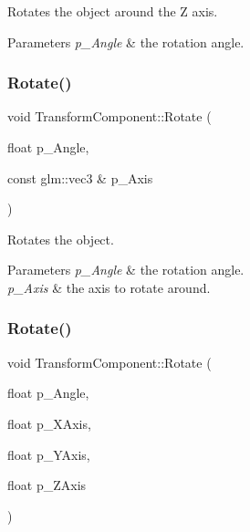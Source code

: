 Rotates the object around the Z axis. 


\begin{DoxyParams}{Parameters}
{\em p\+\_\+\+Angle} & the rotation angle. \\
\hline
\end{DoxyParams}
\mbox{\label{class_transform_component_a2417252e806d5f67a5cdb25bd4e90a42}} 
\subsubsection{\texorpdfstring{Rotate()}{Rotate()}\hspace{0.1cm}{\footnotesize\ttfamily [1/2]}}
{\footnotesize\ttfamily void Transform\+Component\+::\+Rotate (\begin{DoxyParamCaption}\item[{float}]{p\+\_\+\+Angle,  }\item[{const glm\+::vec3 \&}]{p\+\_\+\+Axis }\end{DoxyParamCaption})\hspace{0.3cm}{\ttfamily [inline]}}



Rotates the object. 


\begin{DoxyParams}{Parameters}
{\em p\+\_\+\+Angle} & the rotation angle. \\
\hline
{\em p\+\_\+\+Axis} & the axis to rotate around. \\
\hline
\end{DoxyParams}
\mbox{\label{class_transform_component_aabc8784119f8794363bc1b3cfe12c4a7}} 
\subsubsection{\texorpdfstring{Rotate()}{Rotate()}\hspace{0.1cm}{\footnotesize\ttfamily [2/2]}}
{\footnotesize\ttfamily void Transform\+Component\+::\+Rotate (\begin{DoxyParamCaption}\item[{float}]{p\+\_\+\+Angle,  }\item[{float}]{p\+\_\+\+X\+Axis,  }\item[{float}]{p\+\_\+\+Y\+Axis,  }\item[{float}]{p\+\_\+\+Z\+Axis }\end{DoxyParamCaption})\hspace{0.3cm}{\ttfamily [inline]}}



